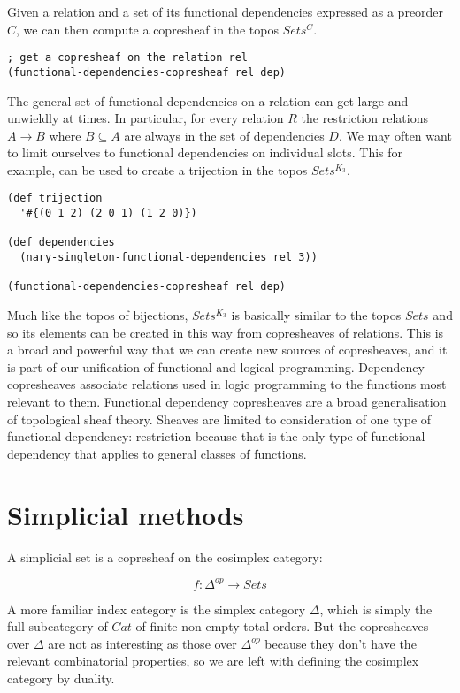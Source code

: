 \documentclass[a4paper,11pt]{report}
\begin{document}
Given a relation and a set of its functional dependencies expressed as a preorder $C$, we can then compute a copresheaf in the topos $Sets^C$.

\begin{lstlisting}
; get a copresheaf on the relation rel
(functional-dependencies-copresheaf rel dep)
\end{lstlisting}

The general set of functional dependencies on a relation can get large and unwieldly at times. In particular, for every relation $R$ the restriction relations $A \to B$ where $B \subseteq A$ are always in the set of dependencies $D$. We may often want to limit ourselves to functional dependencies on individual slots. This for example, can be used to create a trijection in the topos $Sets^{K_3}$.


\begin{lstlisting}
(def trijection 
  '#{(0 1 2) (2 0 1) (1 2 0)})
  
(def dependencies 
  (nary-singleton-functional-dependencies rel 3))
  
(functional-dependencies-copresheaf rel dep)
\end{lstlisting}

Much like the topos of bijections, $Sets^{K_3}$ is basically similar to the topos $Sets$ and so its elements can be created in this way from copresheaves of relations. This is a broad and powerful way that we can create new sources of copresheaves, and it is part of our unification of functional and logical programming. Dependency copresheaves associate relations used in logic programming to the functions most relevant to them. Functional dependency copresheaves are a broad generalisation of topological sheaf theory. Sheaves are limited to consideration of one type of functional dependency: restriction because that is the only type of functional dependency that applies to general classes of functions.

\newpage 

\section{Simplicial methods}
A simplicial set is a copresheaf on the cosimplex category:

\[ f: \Delta^{op} \to Sets \]

A more familiar index category is the simplex category $\Delta$, which is simply the full subcategory of $Cat$ of finite non-empty total orders. But the copresheaves over $\Delta$ are not as interesting as those over $\Delta^{op}$ because they don't have the relevant combinatorial properties, so we are left with defining the cosimplex category by duality.
\end{document}
